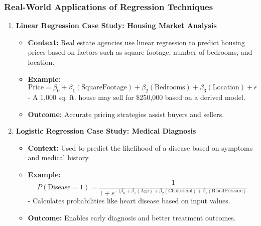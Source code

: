 \documentclass[aspectratio=169]{beamer}
\begin{document}
\begin{frame}
    \frametitle{Real-World Applications of Regression Techniques}

    \begin{enumerate}
        \item \textbf{Linear Regression Case Study: Housing Market Analysis}
        \begin{itemize}
            \item \textbf{Context:} Real estate agencies use linear regression to predict housing prices based on factors such as square footage, number of bedrooms, and location.
            \item \textbf{Example:}
                \begin{equation}
                    \text{Price} = \beta_0 + \beta_1 (\text{SquareFootage}) + \beta_2 (\text{Bedrooms}) + \beta_3 (\text{Location}) + \epsilon
                \end{equation}
                - A 1,000 sq. ft. house may sell for \$250,000 based on a derived model.
            \item \textbf{Outcome:} Accurate pricing strategies assist buyers and sellers.
        \end{itemize}
        
        \vfill
        
        \item \textbf{Logistic Regression Case Study: Medical Diagnosis}
        \begin{itemize}
            \item \textbf{Context:} Used to predict the likelihood of a disease based on symptoms and medical history.
            \item \textbf{Example:}
                \begin{equation}
                    P(\text{Disease} = 1) = \frac{1}{1 + e^{-(\beta_0 + \beta_1 (\text{Age}) + \beta_2 (\text{Cholesterol}) + \beta_3 (\text{BloodPressure})}} 
                \end{equation}
                - Calculates probabilities like heart disease based on input values.
            \item \textbf{Outcome:} Enables early diagnosis and better treatment outcomes.
        \end{itemize}
    \end{enumerate}
\end{frame}
\end{document}
